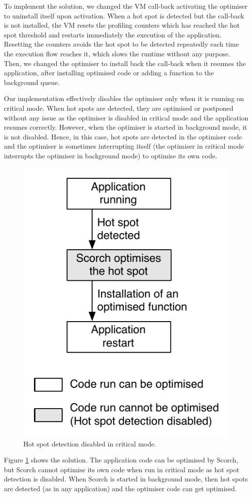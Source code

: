 \documentclass[a4paper,12pt,twoside]{../includes/ThesisStyle}
\begin{document}
To implement the solution, we changed the VM call-back activating the optimiser to uninstall itself upon activation. When a hot spot is detected but the call-back is not installed, the VM resets the profiling counters which has reached the hot spot threshold and restarts immediately the execution of the application. Resetting the counters avoids the hot spot to be detected repeatedly each time the execution flow reaches it, which slows the runtime without any purpose. Then, we changed the optimiser to install back the call-back when it resumes the application, after installing optimised code or adding a function to the background queue.

Our implementation effectively disables the optimiser only when it is running on critical mode. When hot spots are detected, they are optimised or postponed without any issue as the optimiser is disabled in critical mode and the application resumes correctly. However, when the optimiser is started in background mode, it is not disabled. Hence, in this case, hot spots are detected in the optimiser code and the optimiser is sometimes interrupting itself (the optimiser in critical mode interrupts the optimiser in background mode) to optimise its own code.

\begin{figure}[h!]
    \begin{center}
        \includegraphics[width=0.4\linewidth]{Disabling}
        \caption{Hot spot detection disabled in critical mode.}
        \label{fig:Disabling}
    \end{center}
\end{figure}

Figure \ref{fig:Disabling} shows the solution. The application code can be optimised by Scorch, but Scorch cannot optimise its own code when run in critical mode as hot spot detection is disabled. When Scorch is started in background mode, then hot spots are detected (as in any application) and the optimiser code can get optimised.
\end{document}
